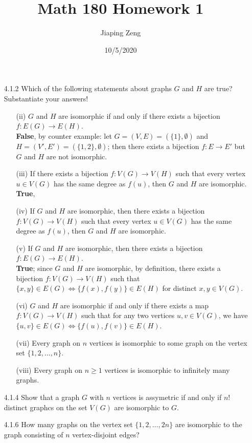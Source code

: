 \documentclass{article}
\title{Math 180 Homework 1}
\date{10/5/2020}
\author{Jiaping Zeng}
\begin{document}
\maketitle

\begin{itemize}
    \item [4.1.2] Which of the following statements about graphs $G$ and $H$ are true? Substantiate your answers!
    \begin{itemize}
        \item [(ii)] $G$ and $H$ are isomorphic if and only if there exists a bijection $f:E(G)\rightarrow E(H)$.\\\textbf{False}, by counter example: let $G=(V,E)=(\{1\},\emptyset)$ and $H=(V',E')=(\{1,2\},\emptyset)$; then there exists a bijection $f:E\rightarrow E'$ but $G$ and $H$ are not isomorphic.
        \item [(iii)] If there exists a bijection $f:V(G)\rightarrow V(H)$ such that every vertex $u\in V(G)$ has the same degree as $f(u)$, then $G$ and $H$ are isomorphic.\\\textbf{True}, 
        \item [(iv)] If $G$ and $H$ are isomorphic, then there exists a bijection $f:V(G)\rightarrow V(H)$ such that every vertex $u\in V(G)$ has the same degree as $f(u)$, then $G$ and $H$ are isomorphic.
        \item [(v)] If $G$ and $H$ are isomorphic, then there exists a bijection $f:E(G)\rightarrow E(H)$.\\\textbf{True}; since $G$ and $H$ are isomorphic, by definition, there exists a bijection $f:V(G)\rightarrow V(H)$ such that $\{x,y\}\in E(G)\Leftrightarrow\{f(x),f(y)\}\in E(H)$ for distinct $x,y\in V(G)$. 
        \item [(vi)] $G$ and $H$ are isomorphic if and only if there exists a map $f:V(G)\rightarrow V(H)$ such that for any two vertices $u,v\in V(G)$, we have $\{u,v\}\in E(G)\Leftrightarrow\{f(u),f(v)\}\in E(H)$.
        \item [(vii)] Every graph on $n$ vertices is isomorphic to some graph on the vertex set $\{1,2,\ldots,n\}$.
        \item [(viii)] Every graph on $n\geq 1$ vertices is isomorphic to infinitely many graphs.
    \end{itemize}
    \item [4.1.4] Show that a graph $G$ with $n$ vertices is assymetric if and only if $n!$ distinct graphcs on the set $V(G)$ are isomorphic to $G$.
    \item [4.1.6] How many graphs on the vertex set $\{1,2,\ldots,2n\}$ are isomorphic to the graph consisting of $n$ vertex-disjoint edges?

\end{itemize}
\end{document}
